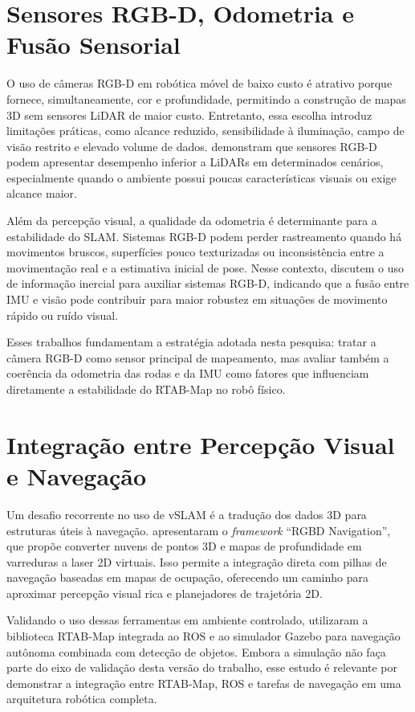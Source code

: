 \section{Sensores RGB-D, Odometria e Fusão Sensorial}

O uso de câmeras RGB-D em robótica móvel de baixo custo é atrativo porque fornece, simultaneamente, cor e profundidade, permitindo a construção de mapas 3D sem sensores LiDAR de maior custo. Entretanto, essa escolha introduz limitações práticas, como alcance reduzido, sensibilidade à iluminação, campo de visão restrito e elevado volume de dados.  demonstram que sensores RGB-D podem apresentar desempenho inferior a LiDARs em determinados cenários, especialmente quando o ambiente possui poucas características visuais ou exige alcance maior.

Além da percepção visual, a qualidade da odometria é determinante para a estabilidade do SLAM. Sistemas RGB-D podem perder rastreamento quando há movimentos bruscos, superfícies pouco texturizadas ou inconsistência entre a movimentação real e a estimativa inicial de pose. Nesse contexto,  discutem o uso de informação inercial para auxiliar sistemas RGB-D, indicando que a fusão entre IMU e visão pode contribuir para maior robustez em situações de movimento rápido ou ruído visual.

Esses trabalhos fundamentam a estratégia adotada nesta pesquisa: tratar a câmera RGB-D como sensor principal de mapeamento, mas avaliar também a coerência da odometria das rodas e da IMU como fatores que influenciam diretamente a estabilidade do RTAB-Map no robô físico.

\section{Integração entre Percepção Visual e Navegação}

Um desafio recorrente no uso de vSLAM é a tradução dos dados 3D para estruturas úteis à navegação.  apresentaram o \textit{framework} ``RGBD Navigation'', que propõe converter nuvens de pontos 3D e mapas de profundidade em varreduras a laser 2D virtuais. Isso permite a integração direta com pilhas de navegação baseadas em mapas de ocupação, oferecendo um caminho para aproximar percepção visual rica e planejadores de trajetória 2D.

Validando o uso dessas ferramentas em ambiente controlado,  utilizaram a biblioteca RTAB-Map integrada ao ROS e ao simulador Gazebo para navegação autônoma combinada com detecção de objetos. Embora a simulação não faça parte do eixo de validação desta versão do trabalho, esse estudo é relevante por demonstrar a integração entre RTAB-Map, ROS e tarefas de navegação em uma arquitetura robótica completa.

